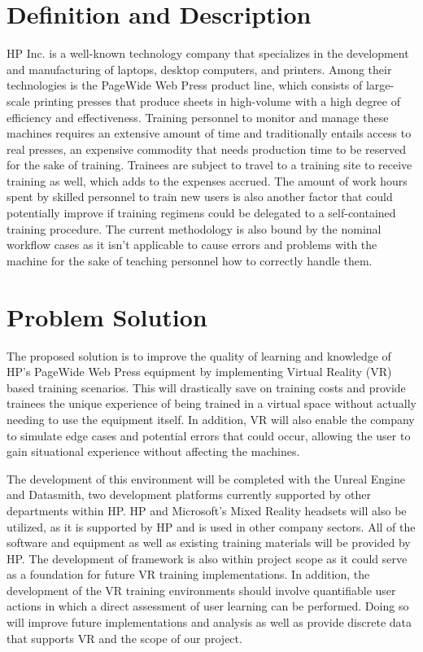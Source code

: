 \documentclass[onecolumn, draftclsnofoot,10pt, compsoc]{IEEEtran}
\begin{document}
\section{Definition and Description}
HP Inc. is a well-known technology company that specializes in the development and manufacturing of laptops, desktop computers, and printers. Among their technologies is the PageWide Web Press product line, which consists of large-scale printing presses that produce sheets in high-volume with a high degree of efficiency and effectiveness. Training personnel to monitor and manage these machines requires an extensive amount of time and traditionally entails access to real presses, an expensive commodity that needs production time to be reserved for the sake of training. Trainees are subject to travel to a training site to receive training as well, which adds to the expenses accrued. The amount of work hours spent by skilled personnel to train new users is also another factor that could potentially improve if training regimens could be delegated to a self-contained training procedure. The current methodology is also bound by the nominal workflow cases as it isn’t applicable to cause errors and problems with the machine for the sake of teaching personnel how to correctly handle them.

\section{Problem Solution}
The proposed solution is to improve the quality of learning and knowledge of HP's PageWide Web Press equipment by implementing Virtual Reality (VR) based training scenarios. This will drastically save on training costs and provide trainees the unique experience of being trained in a virtual space without actually needing to use the equipment itself. In addition, VR will also enable the company to simulate edge cases and potential errors that could occur, allowing the user to gain situational experience without affecting the machines.

The development of this environment will be completed with the Unreal Engine and Datasmith, two development platforms currently supported by other departments within HP. HP and Microsoft’s Mixed Reality headsets will also be utilized, as it is supported by HP and is used in other company sectors. All of the software and equipment as well as existing training materials will be provided by HP. The development of framework is also within project scope as it could serve as a foundation for future VR training implementations. In addition, the development of the VR training environments should involve quantifiable user actions in which a direct assessment of user learning can be performed. Doing so will improve future implementations and analysis as well as provide discrete data that supports VR and the scope of our project.
\end{document}
